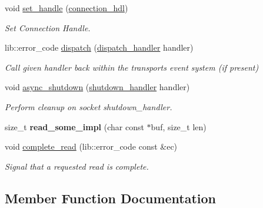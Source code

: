 \begin{DoxyCompactItemize}
void \mbox{\hyperlink{classwebsocketpp_1_1transport_1_1debug_1_1connection_affdbe8c6860526e66b651ddd402f9cf3}{set\+\_\+handle}} (\mbox{\hyperlink{namespacewebsocketpp_a6b3d26a10ee7229b84b776786332631d}{connection\+\_\+hdl}})
\begin{DoxyCompactList}\small\item\em Set Connection Handle. \end{DoxyCompactList}\item 
lib\+::error\+\_\+code \mbox{\hyperlink{classwebsocketpp_1_1transport_1_1debug_1_1connection_a4cac08eb7b8646fc042d465b3bb645a6}{dispatch}} (\mbox{\hyperlink{namespacewebsocketpp_1_1transport_a6658447b2e10f4c712dd792aad0e0c78}{dispatch\+\_\+handler}} handler)
\begin{DoxyCompactList}\small\item\em Call given handler back within the transport\textquotesingle{}s event system (if present) \end{DoxyCompactList}\item 
void \mbox{\hyperlink{classwebsocketpp_1_1transport_1_1debug_1_1connection_aa1269aca10cf5de3cf031eac5f499075}{async\+\_\+shutdown}} (\mbox{\hyperlink{namespacewebsocketpp_1_1transport_af39aff6fc4cb76f7df0d5322b734d156}{shutdown\+\_\+handler}} handler)
\begin{DoxyCompactList}\small\item\em Perform cleanup on socket shutdown\+\_\+handler. \end{DoxyCompactList}\item 
\mbox{\label{classwebsocketpp_1_1transport_1_1debug_1_1connection_a7e17152ea6389887e1a19da2ca53cf8b}} 
size\+\_\+t {\bfseries read\+\_\+some\+\_\+impl} (char const $\ast$buf, size\+\_\+t len)
\item 
void \mbox{\hyperlink{classwebsocketpp_1_1transport_1_1debug_1_1connection_a1eb6d0259dfd111b99edc1edae4014f5}{complete\+\_\+read}} (lib\+::error\+\_\+code const \&ec)
\begin{DoxyCompactList}\small\item\em Signal that a requested read is complete. \end{DoxyCompactList}\end{DoxyCompactItemize}


\subsection{Member Function Documentation}
\mbox{\label{classwebsocketpp_1_1transport_1_1debug_1_1connection_a9dd1522c7700b42b9d54b32d394e32fe}} 
